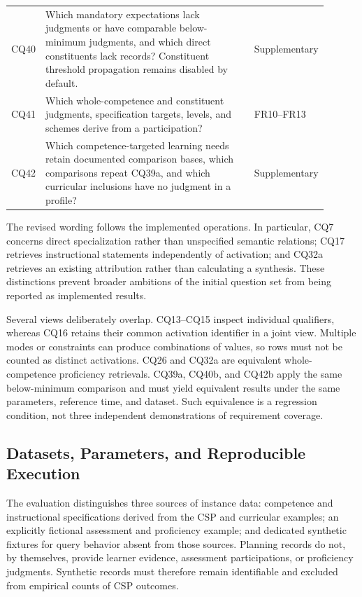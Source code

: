 \begin{longtable}{p{0.08\linewidth} p{0.70\linewidth} p{0.12\linewidth}}
CQ40 & Which mandatory expectations lack judgments or have comparable below-minimum judgments, and which direct constituents lack records? Constituent threshold propagation remains disabled by default. & Supplementary \\
CQ41 & Which whole-competence and constituent judgments, specification targets, levels, and schemes derive from a participation? & FR10--FR13 \\
CQ42 & Which competence-targeted learning needs retain documented comparison bases, which comparisons repeat CQ39a, and which curricular inclusions have no judgment in a profile? & Supplementary \\
\end{longtable}
\endgroup

The revised wording follows the implemented operations. In particular,
CQ7 concerns direct specialization rather than unspecified semantic
relations; CQ17 retrieves instructional statements independently of
activation; and CQ32a retrieves an existing attribution rather than
calculating a synthesis. These distinctions prevent broader ambitions
of the initial question set from being reported as implemented results.

Several views deliberately overlap. CQ13--CQ15 inspect individual
qualifiers, whereas CQ16 retains their common activation identifier in
a joint view. Multiple modes or constraints can produce combinations
of values, so rows must not be counted as distinct activations. CQ26
and CQ32a are equivalent whole-competence proficiency retrievals.
CQ39a, CQ40b, and CQ42b apply the same below-minimum comparison and
must yield equivalent results under the same parameters, reference
time, and dataset. Such equivalence is a regression condition, not
three independent demonstrations of requirement coverage.

\subsection{Datasets, Parameters, and Reproducible Execution}

The evaluation distinguishes three sources of instance data:
competence and instructional specifications derived from the CSP and
curricular examples; an explicitly fictional assessment and proficiency
example; and dedicated synthetic fixtures for query behavior absent
from those sources. Planning records do not, by themselves, provide
learner evidence, assessment participations, or proficiency judgments.
Synthetic records must therefore remain identifiable and excluded
from empirical counts of CSP outcomes.


